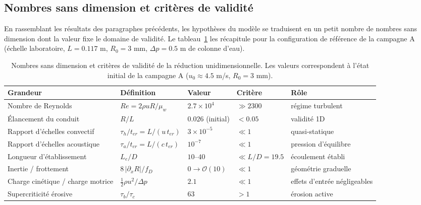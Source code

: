 \documentclass[11pt,a4paper]{report}
\newcommand{\ter}{{t_{er}}}
\begin{document}
\subsection{Nombres sans dimension et critères de validité}
\label{sec:sansdim}

En rassemblant les résultats des paragraphes précédents, les hypothèses du modèle se traduisent en un
petit nombre de nombres sans dimension dont la valeur fixe le domaine de validité. Le
tableau~\ref{tab:sansdim} les récapitule pour la configuration de référence de la campagne A
(échelle laboratoire, \(L = 0.117\) m, \(R_0 = 3\) mm, \(\Delta p = 0.5\) m de colonne d'eau).

\begin{table}[H]
\centering
\caption{Nombres sans dimension et critères de validité de la réduction unidimensionnelle. Les valeurs
correspondent à l'état initial de la campagne A (\(u_0 \approx 4.5\) m/s, \(R_0 = 3\) mm).}
\label{tab:sansdim}
\small
\begin{tabular}{lllll}
\toprule
Grandeur & Définition & Valeur & Critère & Rôle \\
\midrule
Nombre de Reynolds & \(Re = 2\rho u R/\mu_w\) & \(2.7\times10^{4}\) & \(\gg 2300\) & régime turbulent \\
Élancement du conduit & \(R/L\) & \(0.026\) (initial) & \(< 0.05\) & validité 1D \\
Rapport d'échelles convectif & \(\tau_h/\ter = L/(u\,\ter)\) & \(3\times10^{-5}\) & \(\ll 1\) & quasi-statique \\
Rapport d'échelles acoustique & \(\tau_a/\ter = L/(c\,\ter)\) & \(10^{-7}\) & \(\ll 1\) & pression d'équilibre \\
Longueur d'établissement & \(L_e/D\) & \(10\)--\(40\) & \(\ll L/D = 19.5\) & écoulement établi \\
Inertie / frottement & \(8\,|\partial_x R|/f_D\) & \(0 \to \mathcal{O}(10)\) & \(\ll 1\) & géométrie graduelle \\
Charge cinétique / charge motrice & \(\frac{1}{2}\rho u^2/\Delta p\) & \(2.1\) & \(\ll 1\) & effets d'entrée négligeables \\
Supercriticité érosive & \(\tau_b/\tau_c\) & \(63\) & \(>1\) & érosion active \\
\bottomrule
\end{tabular}
\end{table}
\end{document}
